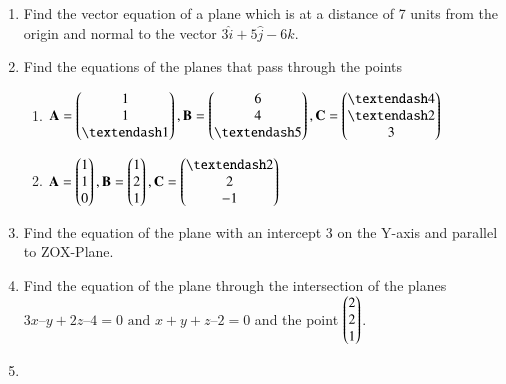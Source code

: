 \begin{enumerate}[label=\thesubsection.\arabic*,ref=\thesubsection.\theenumi]
\item Find the vector equation of a plane which is at a distance of 7 units from the origin and normal to the vector $3\hat{i}+5\hat{j}-6\hat{k}$.
	\\
    \solution
		
	\item Find the equations of the planes that pass through the points
\begin{enumerate}
\item $\vec{A}= \myvec{1\\1\\– 1}, \vec{B}=\myvec{6\\4\\– 5},\vec{C}= \myvec{– 4\\– 2\\3}$
\item $\vec{A}= \myvec{1\\1\\0}, \vec{B}= \myvec{1\\2\\1}, \vec{C}= \myvec{– 2\\2\\-1}$
\end{enumerate}
    \solution
		
	\item Find the equation of the plane with an intercept 3 on the Y-axis and parallel to ZOX-Plane.\\
    \solution
	\item  Find the equation of the plane through the intersection of the planes $3{x} – {y} + 2{z} – 4 = 0 \text{ and } {x} + {y} + {z} – 2 = 0$ and the point $\begin{pmatrix}2\\2\\1\end{pmatrix}$.
    \solution
\item 


\end{enumerate}

